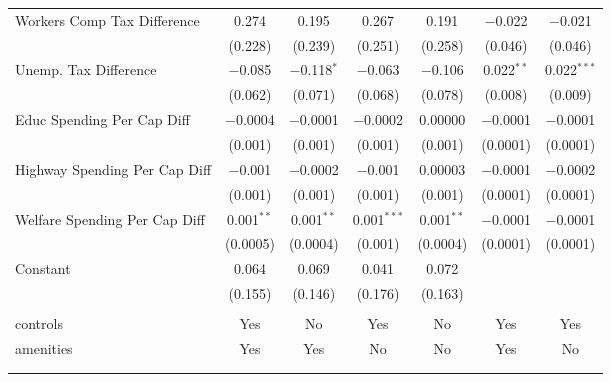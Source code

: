 \begin{table}[!htbp]
\begin{tabular}{@{\extracolsep{5pt}}lcccccc}
  Workers Comp Tax Difference & 0.274 & 0.195 & 0.267 & 0.191 & $-$0.022 & $-$0.021 \\ 
  & (0.228) & (0.239) & (0.251) & (0.258) & (0.046) & (0.046) \\ 
  Unemp. Tax Difference & $-$0.085 & $-$0.118$^{*}$ & $-$0.063 & $-$0.106 & 0.022$^{**}$ & 0.022$^{***}$ \\ 
  & (0.062) & (0.071) & (0.068) & (0.078) & (0.008) & (0.009) \\ 
  Educ Spending Per Cap Diff & $-$0.0004 & $-$0.0001 & $-$0.0002 & 0.00000 & $-$0.0001 & $-$0.0001 \\ 
  & (0.001) & (0.001) & (0.001) & (0.001) & (0.0001) & (0.0001) \\ 
  Highway Spending Per Cap Diff & $-$0.001 & $-$0.0002 & $-$0.001 & 0.00003 & $-$0.0001 & $-$0.0002 \\ 
  & (0.001) & (0.001) & (0.001) & (0.001) & (0.0001) & (0.0001) \\ 
  Welfare Spending Per Cap Diff & 0.001$^{**}$ & 0.001$^{**}$ & 0.001$^{***}$ & 0.001$^{**}$ & $-$0.0001 & $-$0.0001 \\ 
  & (0.0005) & (0.0004) & (0.001) & (0.0004) & (0.0001) & (0.0001) \\ 
  Constant & 0.064 & 0.069 & 0.041 & 0.072 &  &  \\ 
  & (0.155) & (0.146) & (0.176) & (0.163) &  &  \\ 
 \hline \\[-1.8ex] 
controls & Yes & No & Yes & No & Yes & Yes \\ 
amenities & Yes & Yes & No & No & Yes & No \\ 
\hline \\[-1.8ex] 
\hline 
\hline \\[-1.8ex] 
\end{tabular} 
\end{table} 
